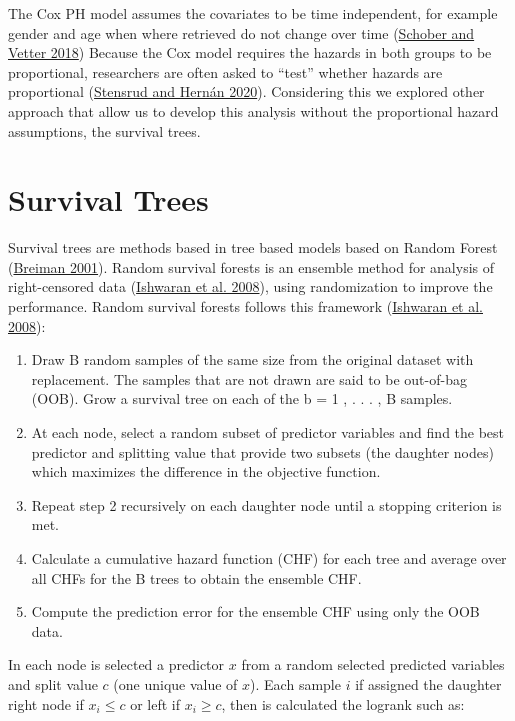 \documentclass[
  12pt,
]{article}
\providecommand{\tightlist}{%
  \setlength{\itemsep}{0pt}\setlength{\parskip}{0pt}}
\begin{document}
The Cox PH model assumes the covariates to be time independent, for example
gender and age when where retrieved do not change over time (\protect\hyperlink{ref-Schober2018Survival}{Schober and Vetter 2018})
Because the Cox model requires the hazards in both groups to be proportional,
researchers are often asked to ``test'' whether hazards are proportional
(\protect\hyperlink{ref-Stensrud_Hernuxe1n_2020}{Stensrud and Hernán 2020}).
Considering this we explored other approach that allow us to develop this analysis without
the proportional hazard assumptions, the survival trees.

\hypertarget{survival-trees}{%
\section{Survival Trees}\label{survival-trees}}

Survival trees are methods based in tree based models based on Random Forest (\protect\hyperlink{ref-Breiman_2001}{Breiman 2001}).
Random survival forests is an ensemble method for analysis of right-censored
data (\protect\hyperlink{ref-Ishwaran_Kogalur_Blackstone_Lauer_2008}{Ishwaran et al. 2008}), using randomization to
improve the performance.
Random survival forests follows this framework (\protect\hyperlink{ref-Ishwaran_Kogalur_Blackstone_Lauer_2008}{Ishwaran et al. 2008}):

\begin{enumerate}
\def\labelenumi{\arabic{enumi}.}
\tightlist
\item
  Draw B random samples of the same size from the original dataset with replacement. The samples that are not drawn are said to be out-of-bag (OOB). Grow a survival tree on each of the b = 1 , . . . , B samples.
\item
  At each node, select a random subset of predictor variables and find the best predictor and splitting value that provide two subsets (the daughter nodes) which maximizes the difference in the objective function.
\item
  Repeat step 2 recursively on each daughter node until a stopping criterion is met.
\item
  Calculate a cumulative hazard function (CHF) for each tree and average over all CHFs for the B trees to obtain the ensemble CHF.
\item
  Compute the prediction error for the ensemble CHF using only the OOB data.
\end{enumerate}

In each node is selected a predictor \(x\) from a random selected predicted variables
and split value \(c\) (one unique value of \(x\)).
Each sample \(i\) if assigned the daughter right node if \(x_i \le c\) or left if
\(x_i \ge c\), then is calculated the logrank such as:
\end{document}
